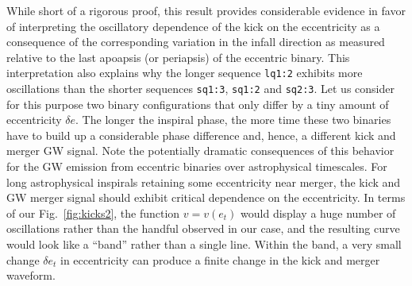 \documentclass[floats,floatfix,showpacs,amssymb,prd,twocolumn,superscriptaddress,nofootinbib,nolongbibliography,reprint]{revtex4-2}
\newcommand{\mr}[1]{{\textcolor{cyan}{\sf{[MR: #1]}} }}
\newcommand{\us}[1]{{\textcolor{teal}{\sf{[US: #1]}} }}
\newcommand{\eb}[1]{{\textcolor{blue}{\sf{[EB: #1]}} }}
\begin{document}
While short of a rigorous proof, this result provides considerable
evidence in favor of interpreting the oscillatory dependence of the
kick on the eccentricity as a consequence of the corresponding
variation in the infall direction as measured relative to the last
apoapsis (or periapsis) of the eccentric binary. This interpretation
also explains why the longer sequence \texttt{lq1:2} exhibits more
oscillations than the shorter sequences \texttt{sq1:3}, \texttt{sq1:2}
and \texttt{sq2:3}. Let us consider for this purpose two binary
configurations that only differ by a tiny amount of eccentricity
$\delta e$. The longer the inspiral phase, the more time these two
binaries have to build up a considerable phase difference and, hence,
a different kick and merger GW signal. Note the potentially dramatic
consequences of this behavior for the GW emission from eccentric
binaries over astrophysical timescales. For long astrophysical
inspirals retaining some eccentricity near merger,
the kick and GW merger signal should exhibit critical dependence on
the
eccentricity. In terms of our Fig.~\ref{fig:kicks2}, the function
$v=v(e_t)$ would display a huge number of oscillations rather than the
handful observed in our case, and the resulting curve would look like
a ``band'' rather than a single line. Within the band, a very small
change $\delta e_t$ in eccentricity can produce a finite change in the
kick and merger waveform.
\end{document}
